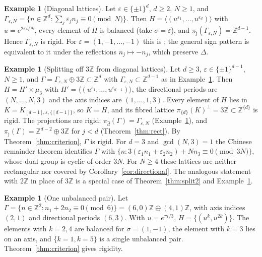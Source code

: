 \documentclass[11pt,reqno]{amsart}
\theoremstyle{definition}
\newtheorem{example}[theorem]{Example}
\theoremstyle{remark}
\newcommand{\Z}{\mathbb Z}
\begin{document}
\begin{example}[Diagonal lattices]\label{ex:diagonal}
Let $\varepsilon\in\{\pm1\}^d$, $d\ge2$, $N\ge1$, and
$\Gamma_{\varepsilon,N}=\{n\in\Z^d:\sum_j\varepsilon_jn_j\equiv0\pmod N\}$.  Then
$H=\langle(u^{\varepsilon_1},\dots,u^{\varepsilon_d})\rangle$ with $u=e^{2\pi i/N}$,
every element of $H$ is balanced (take $\sigma=\varepsilon$), and
$\pi_{\hat\jmath}(\Gamma_{\varepsilon,N})=\Z^{d-1}$.  Hence $\Gamma_{\varepsilon,N}$ is
rigid.  For $\varepsilon=(1,-1,\dots,-1)$ this is \cite[Theorem~6.1]{FFORS2026};
the general sign pattern is equivalent to it under the reflections
$n_j\mapsto-n_j$, which preserve $\Delta$.
\end{example}

\begin{example}[Splitting off $3\Z$ from diagonal lattices]\label{ex:new3D}
Let $d\ge3$, $\varepsilon\in\{\pm1\}^{d-1}$, $N\ge1$, and
$\Gamma=\Gamma_{\varepsilon,N}\oplus3\Z\subset\Z^d$ with
$\Gamma_{\varepsilon,N}\subset\Z^{d-1}$ as in Example~\ref{ex:diagonal}.  Then
$H=H'\times\mu_3$ with $H'=\langle(u^{\varepsilon_1},\dots,u^{\varepsilon_{d-1}})\rangle$,
the directional periods are $(N,\dots,N,3)$ and the axis indices are
$(1,\dots,1,3)$.  Every element of $H$ lies in
$K=K_{[d-1],\varepsilon,\{[d-1]\}}$, so $K=H$, and its fibred lattice
$\pi_{\{d\}}(K)^\perp=3\Z\subset\Z^{\{d\}}$ is rigid.  The projections are rigid:
$\pi_{\hat d}(\Gamma)=\Gamma_{\varepsilon,N}$ (Example~\ref{ex:diagonal}), and
$\pi_{\hat\jmath}(\Gamma)=\Z^{d-2}\oplus3\Z$ for $j<d$ (Theorem~\ref{thm:rect}).
By Theorem~\ref{thm:criterion}, $\Gamma$ is rigid.  For $d=3$ and
$\gcd(N,3)=1$ the Chinese remainder theorem identifies $\Gamma$ with
$\{n:3(\varepsilon_1n_1+\varepsilon_2n_2)+Nn_3\equiv0\pmod{3N}\}$, whose dual group
is cyclic of order $3N$.  For $N\ge4$ these lattices are neither rectangular
nor covered by Corollary~\ref{cor:directional}.  The analogous statement with
$2\Z$ in place of $3\Z$ is a special case of Theorem~\ref{thm:split2} and
Example~\ref{ex:diagonal}.
\end{example}

\begin{example}[One unbalanced pair]\label{ex:pair}
Let $\Gamma=\{n\in\Z^2:n_1+2n_2\equiv0\pmod 6\}=(6,0)\Z\oplus(4,1)\Z$, with
axis indices $(2,1)$ and directional periods $(6,3)$.  With $u=e^{\pi i/3}$,
$H=\{(u^k,u^{2k})\}$.  The elements with $k=2,4$ are balanced for
$\sigma=(1,-1)$, the element with $k=3$ lies on an axis, and $\{k=1,k=5\}$ is a
single unbalanced pair.  Theorem~\ref{thm:criterion} gives rigidity.
\end{example}
\end{document}
